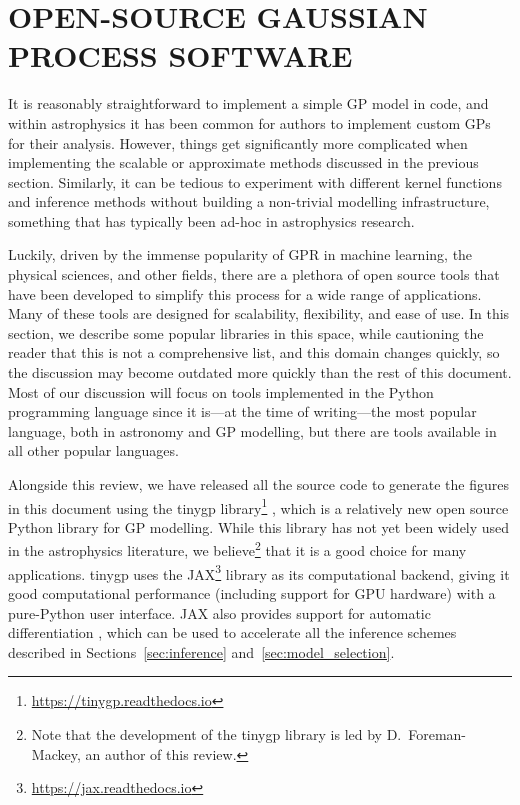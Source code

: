 \documentclass[letterpaper]{ar-1col}
\newcommand{\project}[1]{\textsf{#1}}
\begin{document}
\section{OPEN-SOURCE GAUSSIAN PROCESS SOFTWARE}
\label{sec:open}

It is reasonably straightforward to implement a simple GP model in code, and within astrophysics it has been common for authors to implement custom GPs for their analysis.
However, things get significantly more complicated when implementing the scalable or approximate methods discussed in the previous section.
Similarly, it can be tedious to experiment with different kernel functions and inference methods without building a non-trivial modelling infrastructure, something that has typically been ad-hoc in astrophysics research.

Luckily, driven by the immense popularity of GPR in machine learning, the physical sciences, and other fields, there are a plethora of open source tools that have been developed to simplify this process for a wide range of applications.
Many of these tools are designed for scalability, flexibility, and ease of use.
In this section, we describe some popular libraries in this space, while cautioning the reader that this is not a comprehensive list, and this domain changes quickly, so the discussion may become outdated more quickly than the rest of this document.
Most of our discussion will focus on tools implemented in the \project{Python} programming language since it is---at the time of writing---the most popular language, both in astronomy and GP modelling, but there are tools available in all other popular languages.

Alongside this review, we have released all the source code to generate the figures in this document using the \project{tinygp} library\footnote{\url{https://tinygp.readthedocs.io}} \citep{tinygp}, which is a relatively new open source \project{Python} library for GP modelling.
While this library has not yet been widely used in the astrophysics literature, we believe\footnote{Note that the development of the \project{tinygp} library is led by D.\ Foreman-Mackey, an author of this review.} that it is a good choice for many applications.
\project{tinygp} uses the \project{JAX}\footnote{\url{https://jax.readthedocs.io}} library as its computational backend, giving it good computational performance (including support for GPU hardware) with a pure-\project{Python} user interface.
\project{JAX} also provides support for automatic differentiation \citep[e.g.,][]{autodiff}, which can be used to accelerate all the inference schemes described in Sections~\ref{sec:inference} and~\ref{sec:model_selection}.
\end{document}
